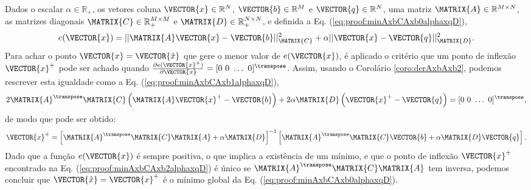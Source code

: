 \begin{myproofT}
\label{proof:theo:minAxbCAxbalphaxqD}
Dados
o escalar $\alpha \in \mathbb{R}_{+}$,
os vetores coluna $\VECTOR{x}\in \mathbb{R}^N$, $\VECTOR{b}\in \mathbb{R}^M$ e $\VECTOR{q}\in \mathbb{R}^N$,  
uma matriz $\MATRIX{A} \in \mathbb{R}^{M\times N}$, 
as matrizes diagonais $\MATRIX{C} \in \mathbb{R}^{M\times M}_+$ e $\MATRIX{D} \in \mathbb{R}^{N\times N}_+$, e 
definida a Eq. (\ref{eq:proof:minAxbCAxb0alphaxqD}),
\begin{equation}\label{eq:proof:minAxbCAxb0alphaxqD}
e(\VECTOR{x})=||\MATRIX{A}\VECTOR{x}-\VECTOR{b}||_{\MATRIX{C}}^2+\alpha||\VECTOR{x}-\VECTOR{q}||_{\MATRIX{D}}^2.
\end{equation}
Para achar o ponto $\VECTOR{x}=\VECTOR{\hat{x}}$ que gere o menor valor de $e(\VECTOR{x})$, é aplicado
o critério que um ponto de inflexão $\VECTOR{x}^+$ pode ser achado quando 
$\frac{\partial e(\VECTOR{x}^+)}{\partial \VECTOR{x} }=[0~ 0~ \hdots~ 0 ]^{\transpose}$.
Assim, usando o Corolário \ref{coro:derAxbAxb2}, podemos 
rescrever esta igualdade como a Eq. (\ref{eq:proof:minAxbCAxb1alphaxqD}),
\begin{equation}\label{eq:proof:minAxbCAxb1alphaxqD}
2 \MATRIX{A}^{\transpose}\MATRIX{C}\left(\MATRIX{A}\VECTOR{x}^+-\VECTOR{b}\right)
+2 \alpha\MATRIX{D}\left(\VECTOR{x}^+-\VECTOR{q}\right)=[0~ 0~ \hdots~ 0 ]^{\transpose},
\end{equation}
de modo que pode ser obtido:
\begin{equation}\label{eq:proof:minAxbCAxb2alphaxqD}
\VECTOR{x}^+=\left[ \MATRIX{A}^{\transpose}\MATRIX{C}\MATRIX{A} +\alpha\MATRIX{D}\right]^{-1} 
\left[ \MATRIX{A}^{\transpose}\MATRIX{C} \VECTOR{b}+\alpha\MATRIX{D}\VECTOR{q}\right].
\end{equation}
Dado que  a função $e(\VECTOR{x})$ é sempre positiva, o que implica a existência de um mínimo,
e que o ponto de inflexão $\VECTOR{x}^+$ encontrado na Eq. (\ref{eq:proof:minAxbCAxb2alphaxqD}) 
é único se $\MATRIX{A}^{\transpose}\MATRIX{C}\MATRIX{A}$ tem inversa, 
podemos concluir que  $\VECTOR{\hat{x}}=\VECTOR{x}^+$ é o mínimo global da Eq. (\ref{eq:proof:minAxbCAxb0alphaxqD}).
\end{myproofT}

